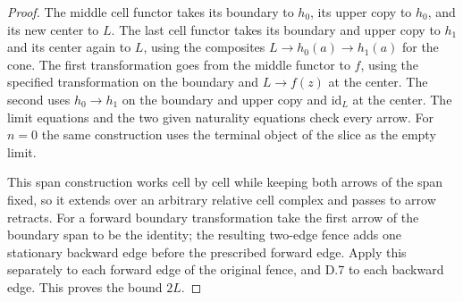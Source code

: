 \begin{proof}
The middle cell functor takes its boundary to $h_0$, its upper copy to $h_0$, and its new center to $L$. The last cell functor takes its boundary and upper copy to $h_1$ and its center again to $L$, using the composites $L\to h_0(a)\to h_1(a)$ for the cone. The first transformation goes from the middle functor to $f$, using the specified transformation on the boundary and $L\to f(z)$ at the center. The second uses $h_0\to h_1$ on the boundary and upper copy and $\mathrm{id}_L$ at the center. The limit equations and the two given naturality equations check every arrow. For $n=0$ the same construction uses the terminal object of the slice as the empty limit.

This span construction works cell by cell while keeping both arrows of the span fixed, so it extends over an arbitrary relative cell complex and passes to arrow retracts. For a forward boundary transformation take the first arrow of the boundary span to be the identity; the resulting two-edge fence adds one stationary backward edge before the prescribed forward edge. Apply this separately to each forward edge of the original fence, and D.7 to each backward edge. This proves the bound $2L$.
\end{proof}


